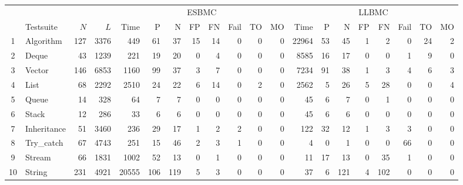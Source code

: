 \documentclass[a4paper]{llncs}
\begin{document}
\begin{table}[t!]
\begin{adjustwidth}{-2cm}{}
\renewcommand\arraystretch{0.9}
\setlength{\tabcolsep}{4pt}
\begin{center} {\small
\begin{tabular}{|c|l|r|r||r|r|r|r|r|r|r|r|r|r|r|r|r|r|r|r|}
\hline
  & & & & \multicolumn{8}{c|}{ESBMC}                                                     & \multicolumn{8}{c|}{LLBMC} \\  \cline{5-20}
  & Testsuite   & $N$  & $L$   & Time  & P    & N   & FP  & FN   & Fail & TO   & MO    & Time   & P   & N   & FP  & FN  & Fail & TO  & MO \\\hline
1 & Algorithm   & 127  & 3376  & 449   & 61   & 37  & 15  & 14   & 0    & 0    & 0     & 22964  & 53  & 45  & 1   & 2   & 0    & 24  & 2\\ %
\hline
2 & Deque       & 43   & 1239  & 221   & 19   & 20  & 0   & 4    & 0    & 0    & 0     & 8585   & 16  & 17  & 0   & 0   & 1    & 9   & 0\\ %
\hline
3 & Vector      & 146  & 6853  & 1160  & 99   & 37  & 3   & 7    & 0    & 0    & 0     & 7234   & 91  & 38  & 1   & 3   & 4    & 6   & 3\\ %
\hline
4 & List        & 68   & 2292  & 2510  & 24   & 22  & 6   & 14   & 0    & 2    & 0     & 2562   & 5   & 26  & 5   & 28  & 0    & 0   & 4\\ %
\hline
5 & Queue       & 14   & 328   & 64    & 7    & 7   & 0   & 0    & 0    & 0    & 0     & 45     & 6   & 7   & 0   & 1   & 0    & 0   & 0\\ %
\hline
6 & Stack       & 12   & 286   & 33    & 6    & 6   & 0   & 0    & 0    & 0    & 0     & 45     & 6   & 6   & 0   & 0   & 0    & 0   & 0\\ %
\hline
7 & Inheritance & 51   & 3460  & 236   & 29   & 17  & 1   & 2    & 2    & 0    & 0     & 122    & 32  & 12  & 1   & 3   & 3    & 0   & 0\\ %
\hline
8 & Try\_catch  & 67   & 4743  & 251   & 15   & 46  & 2   & 3    & 1    & 0    & 0     & 4      & 0   & 1   & 0   & 0   & 66   & 0   & 0 \\ %
\hline
9 & Stream      & 66   & 1831  & 1002  & 52   & 13  & 0   & 1    & 0    & 0    & 0     & 11     & 17  & 13  & 0   & 35  & 1    & 0   & 0\\ %
\hline
10 & String     & 231  & 4921  & 20555 & 106  & 119 & 5   & 3    & 0    & 0    & 0     & 37     & 6   & 121 & 4   & 102 & 0    & 0   & 0\\ %

\end{tabular}}
\end{center}
\end{adjustwidth}
\end{table}
\end{document}

